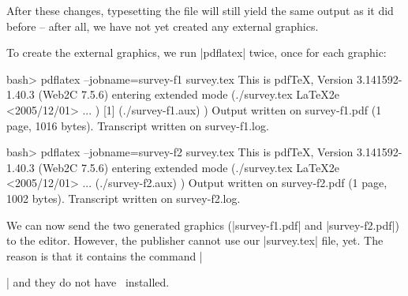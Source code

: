 After these changes, typesetting the file will still yield the same
output as it did before -- after all, we have not yet created any
external graphics.

To create the external graphics, we run |pdflatex| twice, once for
each graphic:
\begin{codeexample}
bash> pdflatex --jobname=survey-f1 survey.tex
This is pdfTeX, Version 3.141592-1.40.3 (Web2C 7.5.6)
entering extended mode
(./survey.tex
LaTeX2e <2005/12/01>
...
) [1] (./survey-f1.aux) )
Output written on survey-f1.pdf (1 page, 1016 bytes).
Transcript written on survey-f1.log.
\end{codeexample}

\begin{codeexample}
bash> pdflatex --jobname=survey-f2 survey.tex
This is pdfTeX, Version 3.141592-1.40.3 (Web2C 7.5.6)
entering extended mode
(./survey.tex
LaTeX2e <2005/12/01>
...
(./survey-f2.aux) )
Output written on survey-f2.pdf (1 page, 1002 bytes).
Transcript written on survey-f2.log.
\end{codeexample}

We can now send the two generated graphics (|survey-f1.pdf| and
|survey-f2.pdf|) to the editor. However, the publisher cannot use our
|survey.tex| file, yet. The reason is that it contains the command
|\usepackage{tikz}| and they do not have \pgfname\ installed.

